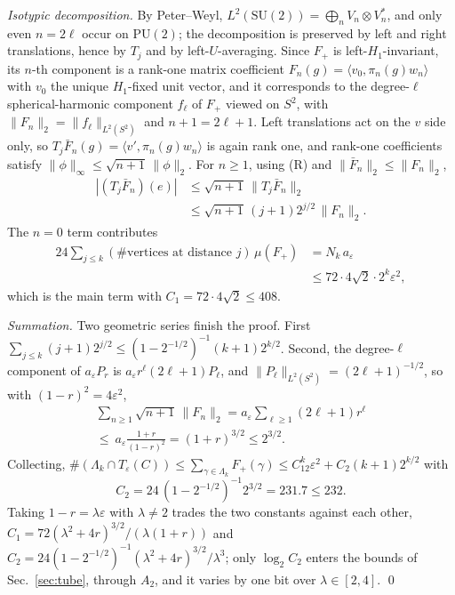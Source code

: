 \documentclass[aps,prx,twocolumn,superscriptaddress,nofootinbib,longbibliography]{revtex4-2}
\theoremstyle{plain}
\theoremstyle{definition}
\theoremstyle{remark}
\newcommand{\PU}{\mathrm{PU}(2)}
\newcommand{\SU}{\mathrm{SU}(2)}
\begin{document}
\emph{Isotypic decomposition.} By Peter--Weyl, $L^2(\SU)=\bigoplus_nV_n\otimes V_n^*$, and only even $n=2\ell$ occur on $\PU$; the decomposition is preserved by left and right translations, hence by $T_j$ and by left-$U$-averaging. Since $F_+$ is left-$H_1$-invariant, its $n$-th component is a rank-one matrix coefficient $F_n(g)=\langle v_0,\pi_n(g)w_n\rangle$ with $v_0$ the unique $H_1$-fixed unit vector, and it corresponds to the degree-$\ell$ spherical-harmonic component $f_\ell$ of $F_+$ viewed on $S^2$, with $\|F_n\|_2=\|f_\ell\|_{L^2(S^2)}$ and $n+1=2\ell+1$. Left translations act on the $v$ side only, so $T_j\bar F_n(g)=\langle v',\pi_n(g)w_n\rangle$ is again rank one, and rank-one coefficients satisfy $\|\phi\|_\infty\le\sqrt{n+1}\,\|\phi\|_2$. For $n\ge1$, using (R) and $\|\bar F_n\|_2\le\|F_n\|_2$,
\begin{equation}
\begin{aligned}
|(T_j\bar F_n)(e)|&\le\sqrt{n+1}\,\|T_j\bar F_n\|_2\\
&\le\sqrt{n+1}\,(j+1)2^{j/2}\,\|F_n\|_2 .
\end{aligned}
\end{equation}
The $n=0$ term contributes
\[\begin{aligned}24\sum_{j\le k}(\#\text{vertices at distance }j)\,\mu(F_+)&=N_k\,a_\varepsilon\\&\le72\cdot4\sqrt2\cdot2^k\varepsilon^2,\end{aligned}\]
which is the main term with $C_1=72\cdot4\sqrt2\le408$.

\emph{Summation.} Two geometric series finish the proof. First $\sum_{j\le k}(j+1)2^{j/2}\le(1-2^{-1/2})^{-1}(k+1)2^{k/2}$. Second, the degree-$\ell$ component of $a_\varepsilon P_r$ is $a_\varepsilon r^\ell(2\ell+1)P_\ell$, and $\|P_\ell\|_{L^2(S^2)}=(2\ell+1)^{-1/2}$, so with $(1-r)^2=4\varepsilon^2$,
\begin{multline}
\sum_{n\ge1}\sqrt{n+1}\,\|F_n\|_2=a_\varepsilon\!\sum_{\ell\ge1}(2\ell+1)r^\ell\\
\le\ a_\varepsilon\frac{1+r}{(1-r)^2}=(1+r)^{3/2}\le2^{3/2}.
\end{multline}
Collecting, $\#(\Lambda_k\cap T_\varepsilon(C))\le\sum_{\gamma\in\Lambda_k}F_+(\gamma)\le C_12^k\varepsilon^2+C_2(k+1)2^{k/2}$ with
\begin{equation}
C_2=24\,(1-2^{-1/2})^{-1}2^{3/2}=231.7\le232 .
\end{equation}
Taking $1-r=\lambda\varepsilon$ with $\lambda\ne2$ trades the two constants against each other, $C_1=72(\lambda^2+4r)^{3/2}/(\lambda(1+r))$ and $C_2=24(1-2^{-1/2})^{-1}(\lambda^2+4r)^{3/2}/\lambda^3$; only $\log_2C_2$ enters the bounds of Sec.~\ref{sec:tube}, through $A_2$, and it varies by one bit over $\lambda\in[2,4]$. \qed
\end{document}
